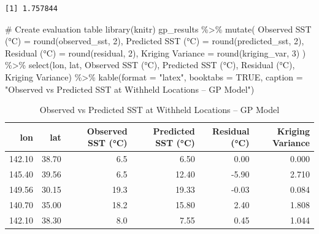 \documentclass[
  11pt,
]{article}
\newenvironment{Shaded}{\begin{snugshade}}{\end{snugshade}}
\newcommand{\AttributeTok}[1]{\textcolor[rgb]{0.40,0.45,0.13}{#1}}
\newcommand{\CommentTok}[1]{\textcolor[rgb]{0.37,0.37,0.37}{#1}}
\newcommand{\ConstantTok}[1]{\textcolor[rgb]{0.56,0.35,0.01}{#1}}
\newcommand{\DecValTok}[1]{\textcolor[rgb]{0.68,0.00,0.00}{#1}}
\newcommand{\FunctionTok}[1]{\textcolor[rgb]{0.28,0.35,0.67}{#1}}
\newcommand{\NormalTok}[1]{\textcolor[rgb]{0.00,0.23,0.31}{#1}}
\newcommand{\OtherTok}[1]{\textcolor[rgb]{0.00,0.23,0.31}{#1}}
\newcommand{\SpecialCharTok}[1]{\textcolor[rgb]{0.37,0.37,0.37}{#1}}
\newcommand{\StringTok}[1]{\textcolor[rgb]{0.13,0.47,0.30}{#1}}
\begin{document}
\begin{verbatim}
[1] 1.757844
\end{verbatim}

\begin{Shaded}
\begin{Highlighting}[]
\CommentTok{\# Create evaluation table}
\FunctionTok{library}\NormalTok{(knitr)}
\NormalTok{gp\_results }\SpecialCharTok{\%\textgreater{}\%}
  \FunctionTok{mutate}\NormalTok{(}
    \StringTok{\textasciigrave{}}\AttributeTok{Observed SST (°C)}\StringTok{\textasciigrave{}} \OtherTok{=} \FunctionTok{round}\NormalTok{(observed\_sst, }\DecValTok{2}\NormalTok{),}
    \StringTok{\textasciigrave{}}\AttributeTok{Predicted SST (°C)}\StringTok{\textasciigrave{}} \OtherTok{=} \FunctionTok{round}\NormalTok{(predicted\_sst, }\DecValTok{2}\NormalTok{),}
    \StringTok{\textasciigrave{}}\AttributeTok{Residual (°C)}\StringTok{\textasciigrave{}} \OtherTok{=} \FunctionTok{round}\NormalTok{(residual, }\DecValTok{2}\NormalTok{),}
    \StringTok{\textasciigrave{}}\AttributeTok{Kriging Variance}\StringTok{\textasciigrave{}} \OtherTok{=} \FunctionTok{round}\NormalTok{(kriging\_var, }\DecValTok{3}\NormalTok{)}
\NormalTok{  ) }\SpecialCharTok{\%\textgreater{}\%}
  \FunctionTok{select}\NormalTok{(lon, lat, }\StringTok{\textasciigrave{}}\AttributeTok{Observed SST (°C)}\StringTok{\textasciigrave{}}\NormalTok{, }\StringTok{\textasciigrave{}}\AttributeTok{Predicted SST (°C)}\StringTok{\textasciigrave{}}\NormalTok{, }\StringTok{\textasciigrave{}}\AttributeTok{Residual (°C)}\StringTok{\textasciigrave{}}\NormalTok{, }\StringTok{\textasciigrave{}}\AttributeTok{Kriging Variance}\StringTok{\textasciigrave{}}\NormalTok{) }\SpecialCharTok{\%\textgreater{}\%}
  \FunctionTok{kable}\NormalTok{(}\AttributeTok{format =} \StringTok{"latex"}\NormalTok{, }\AttributeTok{booktabs =} \ConstantTok{TRUE}\NormalTok{, }\AttributeTok{caption =} \StringTok{"Observed vs Predicted SST at Withheld Locations – GP Model"}\NormalTok{)}
\end{Highlighting}
\end{Shaded}

\begin{table}

\caption{Observed vs Predicted SST at Withheld Locations -- GP Model}
\centering
\begin{tabular}[t]{rrrrrr}
\toprule
lon & lat & Observed SST (°C) & Predicted SST (°C) & Residual (°C) & Kriging Variance\\
\midrule
142.10 & 38.70 & 6.5 & 6.50 & 0.00 & 0.000\\
145.40 & 39.56 & 6.5 & 12.40 & -5.90 & 2.710\\
149.56 & 30.15 & 19.3 & 19.33 & -0.03 & 0.084\\
140.70 & 35.00 & 18.2 & 15.80 & 2.40 & 1.808\\
142.10 & 38.30 & 8.0 & 7.55 & 0.45 & 1.044\\
\bottomrule
\end{tabular}
\end{table}
\end{document}
